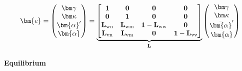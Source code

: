 \begin{equation}
\bm{e}=\begin{pmatrix}
\bm\gamma \\ \bm\kappa \\ \bm{\alpha}' \\\bm{\alpha}
\end{pmatrix}=\underbrace{\begin{bmatrix}
\mathbf{1} & \mathbf{0} & \mathbf{0} & \mathbf{0} \\ 
\mathbf{0} & \mathbf{1}  & \mathbf{0} & \mathbf{0} \\ 
\mathbf{L}_{\rm wn} &\mathbf{L}_{\rm wm} & \mathbf{1} - \mathbf{L}_{\rm ww} & \mathbf{0} \\
\mathbf{L}_{\rm vn} & \mathbf{L}_{\rm vm} & \mathbf{0} & \mathbf{1}-\mathbf{L}_{\rm vv}
\end{bmatrix}}_{\mathbf{L}}
\begin{pmatrix}
\bm\gamma \\ \bm\kappa \\ \bar{\bm{\alpha}}' \\ \bar{\bm{\alpha}}
\end{pmatrix}
\end{equation}
%

\paragraph{Equilibrium}

